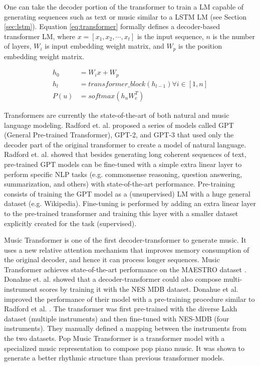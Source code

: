 One can take the decoder portion of the transformer to train a LM capable of generating sequences such as text or music similar to a LSTM LM (see Section \ref{sec:lstm}). Equation \ref{eq:transformer} formally defines a decoder-based transformer LM, where $x = [x_1, x_2, \cdots, x_t]$ is the input sequence, $n$ is the number of layers, $W_i$ is input embedding weight matrix, and $W_p$ is the position embedding weight matrix.

\begin{equation}\label{eq:transformer}
\begin{split}
    h_0 &= W_ix + W_p \\
    h_l &= transformer\_block(h_{l-1}) \forall i \in [1,n] \\
    P(u) &= softmax(h_nW_e^T)
\end{split}
\end{equation}

Transformers are currently the state-of-the-art of both natural and music language modeling. Radford et. al. \cite{Radford2018, radford2019language} proposed a series of models called GPT (General Pre-trained Transformer), GPT-2, and GPT-3 that used only the decoder part of the original transformer to create a model of natural language. Radford et. al. showed that besides generating long coherent sequences of text, pre-trained GPT models can be fine-tuned with a simple extra linear layer to perform specific NLP tasks (e.g. commonsense reasoning, question answering, summarization, and others) with state-of-the-art performance. Pre-training consists of training the GPT model as a (unsupervised) LM with a huge general dataset (e.g. Wikipedia). Fine-tuning is performed by adding an extra linear layer to the pre-trained transformer and training this layer with a smaller dataset explicitly created for the task (supervised).

Music Transformer \cite{huang2018music} is one of the first decoder-transformer to generate music. It uses a new relative attention mechanism that improves memory consumption of the original decoder, and hence it can process longer sequences. Music Transformer achieves state-of-the-art performance on the MAESTRO dataset \cite{hawthorne2018enabling}. Donahue et. al. \cite{donahue2019lakhnes} showed that a decoder-transformer could also compose multi-instrument scores by training it with the NES MDB \cite{donahue2018nesmdb} dataset. Donahue et al. improved the performance of their model with a pre-training procedure similar to Radford et al. \cite{Radford2018}. The transformer was first pre-trained with the diverse Lakh dataset (multiple instruments) and then fine-tuned with NES-MDB (four instruments). They manually defined a mapping between the instruments from the two datasets. Pop Music Transformer \cite{huang2020pop} is a transformer model with a specialized music representation to compose pop piano music. It was shown to generate a better rhythmic structure than previous transformer models.

